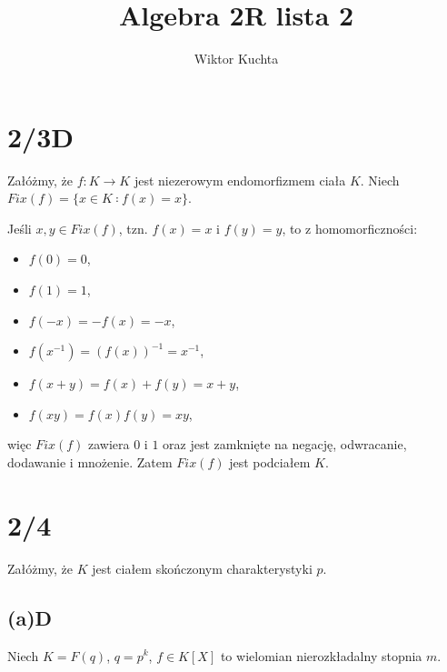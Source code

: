 \documentclass[a4paper, 12pt]{article}
\title{Algebra 2R lista 2}
\author{Wiktor Kuchta}
\date{\vspace{-4ex}}
\newcommand{\+}{\enspace}
\begin{document}
\maketitle

\iffalse
\section*{1/5d}
\begin{align*}
 & w ∈ ℚ[X_1, X_2], w(X^3, X^2) = 0 \\
⇒& w ∈ ℚ[X_2][X_1], w(X^3)(X^2) = 0 \\
⇒& v=w(X^3) ∈ ℚ[X_2][X^3] ≅ ℚ[X^3][X_2], v(X^2) = 0 \\
⇒& v=(X^2-X_2)q(X_2), \\
 &\text{w iloczynie }X\text{ występuje tylko w potędze podzielnej przez }3 \\
\end{align*}
$w ∈ ℚ[X_1, X_2], w(X^3, X^2)$

$w ∈ ℚ[X_1][X_2]$
$w(X^2) ∈ ℚ[X_1][X^2] ≅ ℚ[X^2][X_1]$

\fi

\section*{2/3D}
Załóżmy, że $f: K→K$ jest niezerowym endomorfizmem ciała $K$.
Niech $Fix(f) = \{ x ∈ K ∶ f(x) = x \}$.

Jeśli $x,y ∈ Fix(f)$, tzn. $f(x) = x$ i $f(y) = y$, to z homomorficzności:
\begin{itemize}
	\item $f(0) = 0$,
	\item $f(1) = 1$,
	\item $f(-x) = -f(x) = -x$,
	\item $f(x^{-1}) = (f(x))^{-1} = x^{-1}$,
	\item $f(x+y) = f(x)+f(y)=x+y$,
	\item $f(xy) = f(x)f(y) = xy$,
\end{itemize}
więc $Fix(f)$ zawiera $0$ i $1$ oraz jest zamknięte na
negację, odwracanie, dodawanie i mnożenie.
Zatem $Fix(f)$ jest podciałem $K$.



\section*{2/4}
Załóżmy, że $K$ jest ciałem skończonym charakterystyki $p$.

\subsection*{(a)D}
Niech $K=F(q)$, $q = p^k$, $f ∈ K[X]$ to wielomian nierozkładalny stopnia $m$.
\end{document}
